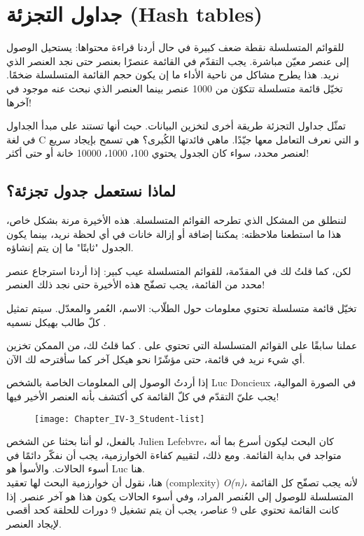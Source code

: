 \chapter{جداول التجزئة (\textenglish{Hash tables})}

للقوائم المتسلسلة نقطة ضعف كبيرة في حال أردنا قراءة محتواها: يستحيل الوصول إلى عنصر معيّن مباشرة. يجب التقدّم في القائمة عنصرًا بعنصر حتى نجد العنصر الذي نريد. هذا يطرح مشاكل من ناحية الأداء ما إن يكون حجم القائمة المتسلسلة ضخمًا. تخيّل قائمة متسلسلة تتكوّن من 1000 عنصر بينما العنصر الذي نبحث عنه موجود في آخرها!

تمثّل جداول التجزئة طريقة أخرى لتخزين البيانات. حيث أنها تستند على مبدأ الجداول في لغة
\textenglish{C}
و التي نعرف التعامل معها جيّدًا. ماهي فائدتها الكُبرى؟ هي تسمح بإيجاد سريع لعنصر محدد، سواء كان الجدول يحتوي 100، 1000، 10000 خانة أو حتى أكثر!

\section{لماذا نستعمل جدول تجزئة؟}

لننطلق من المشكل الذي تطرحه القوائم المتسلسلة. هذه الأخيرة مرنة بشكل خاص، هذا ما استطعنا ملاحظته: يمكننا إضافة أو إزالة خانات في أي لحظة نريد، بينما يكون الجدول "ثابتًا" ما إن يتم إنشاؤه.

لكن، كما قلتُ لك في المقدّمة، للقوائم المتسلسلة عيب كبير: إذا أردنا استرجاع عنصر محدد من القائمة، يجب تصفّح هذه الأخيرة حتى نجد ذلك العنصر!

تخيّل قائمة متسلسلة تحتوي معلومات حول الطلّاب: الاسم، العُمر والمعدّل. سيتم تمثيل كلّ طالب بهيكل نسميه
.

\begin{information}
عملنا سابقًا على القوائم المتسلسلة التي تحتوي على
.
 كما قلتُ لك، من الممكن تخزين أي شيء نريد في قائمة، حتى مؤشّرًا نحو هيكل آخر كما سأقترحه لك الآن.
\end{information}

 إذا أردتُ الوصول إلى المعلومات الخاصة بالشخص
\textenglish{Luc Doncieux}
 في الصورة الموالية، يجب عليّ التقدّم في كلّ القائمة كي أكتشف بأنه العنصر الأخير فيها!
 
\begin{figure}[H]
	\centering
	\texttt{[image: Chapter\_IV-3\_Student-list]}
\end{figure}

\begin{information}
بالفعل، لو أننا بحثنا عن الشخص 
\textenglish{Julien Lefebvre}،
كان البحث ليكون أسرع بما أنه متواجد في بداية القائمة. ومع ذلك، لتقييم كفاءة الخوارزمية، يجب أن نفكّر دائمًا في أسوء الحالات. والأسوأ هو
\textenglish{Luc}
هنا.\\
هنا، نقول أن خوارزمية البحث لها تعقيد
(\textenglish{complexity})
\textit{\textenglish{O(n)}}،
لأنه يجب تصفّح كل القائمة المتسلسلة للوصول إلى العُنصر المراد، وفي أسوء الحالات يكون هذا هو آخر عنصر. إذا كانت القائمة تحتوي على 9 عناصر، يجب أن يتم تشغيل 9 دورات للحلقة كحد أقصى لإيجاد العنصر.
\end{information}

